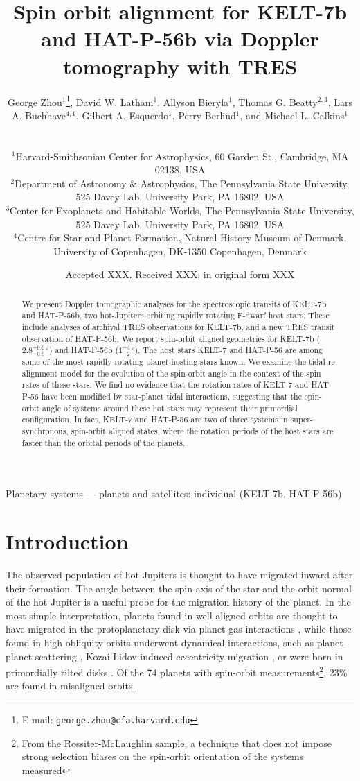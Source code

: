 \documentclass[useAMS,usenatbib]{mn2e}
\title[Doppler tomography with TRES]{Spin orbit alignment for KELT-7b and HAT-P-56b via Doppler tomography with TRES}
\author[G.~Zhou et al.]
{\parbox{\textwidth}
  {George Zhou$^{1}$\thanks{E-mail: \texttt{george.zhou@cfa.harvard.edu}},
    David W. Latham$^{1}$,
    Allyson Bieryla$^{1}$,
    Thomas G. Beatty$^{2,3}$,
    Lars A. Buchhave$^{4,1}$,
    Gilbert A. Esquerdo$^{1}$,
    Perry Berlind$^{1}$,
    and Michael L. Calkins$^{1}$
\vspace{0.4cm}}\\
\parbox{\textwidth}{
  $^{1}${Harvard-Smithsonian Center for Astrophysics, 60 Garden St., Cambridge, MA 02138, USA}\\
  $^{2}${Department of Astronomy \& Astrophysics, The Pennsylvania State University, 525 Davey Lab, University Park, PA 16802, USA}\\
  $^{3}${Center for Exoplanets and Habitable Worlds, The Pennsylvania State University, 525 Davey Lab, University Park, PA 16802, USA}\\
  $^{4}${Centre for Star and Planet Formation, Natural History Museum of Denmark, University of Copenhagen, DK-1350 Copenhagen, Denmark}\\
}}
\begin{document}

\date{Accepted XXX.  Received XXX; in original form XXX}

\pagerange{\pageref{firstpage}--\pageref{lastpage}} 

\maketitle

\label{firstpage}

\begin{abstract}
We present Doppler tomographic analyses for the spectroscopic transits of KELT-7b and HAT-P-56b, two hot-Jupiters orbiting rapidly rotating F-dwarf host stars. These include analyses of archival TRES observations for KELT-7b, and a new TRES transit observation of HAT-P-56b. We report spin-orbit aligned geometries for KELT-7b ($2.8_{-0.6}^{+0.6}\,^\circ$) and HAT-P-56b ($1_{-2}^{+4}\,^\circ$). The host stars KELT-7 and HAT-P-56 are among some of the most rapidly rotating planet-hosting stars known. We examine the tidal re-alignment model for the evolution of the spin-orbit angle in the context of the spin rates of these stars. We find no evidence that the rotation rates of KELT-7 and HAT-P-56 have been modified by star-planet tidal interactions, suggesting that the spin-orbit angle of systems around these hot stars may represent their primordial configuration. In fact, KELT-7 and HAT-P-56 are two of three systems in super-synchronous, spin-orbit aligned states, where the rotation periods of the host stars are faster than the orbital periods of the planets.
\end{abstract}

\begin{keywords}
Planetary systems — planets and satellites: individual (KELT-7b, HAT-P-56b)
\end{keywords}


\section{Introduction}
\label{sec:introduction}

The observed population of hot-Jupiters is thought to have migrated inward after their formation. The angle between the spin axis of the star and the orbit normal of the hot-Jupiter is a useful probe for the migration history of the planet. In the most simple interpretation, planets found in well-aligned orbits are thought to have migrated in the protoplanetary disk via planet-gas interactions \citep[e.g.][]{1996Natur.380..606L}, while those found in high obliquity orbits underwent dynamical interactions, such as planet-planet scattering \citep[e.g.][]{1996Sci...274..954R}, Kozai-Lidov induced eccentricity migration \citep[e.g.][]{2003ApJ...589..605W,2007ApJ...669.1298F}, or were born in primordially tilted disks \citep[e.g.][]{2010MNRAS.401.1505B,2012Natur.491..418B}.  Of the 74 planets with  spin-orbit measurements\footnote{From the Rossiter-McLaughlin sample, a technique that does not impose strong selection biases on the spin-orbit orientation of the systems measured}, 23\% are found in misaligned orbits.
\end{document}
